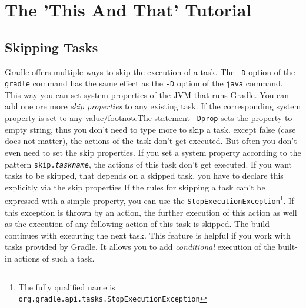 \chapter{The 'This And That' Tutorial} %
\label{cha:the_this_and_that_tutorial}
\section{Skipping Tasks}
Gradle offers multiple ways to skip the execution of a task.
The \texttt{-D} option of the \texttt{gradle} command has the same effect as the \texttt{-D} option of the \texttt{java} command. This way you can set system properties of the JVM that runs Gradle. You can add one ore more \emph{skip properties} to any existing task. If the corresponding system property is set to any value/footnote{The statement \texttt{-Dprop} sets the property to empty string, thus you don't need to type more to skip a task.} except false (case does not matter), the actions of the task don't get executed. But often you don't even need to set the skip properties. If you set a system property according to the pattern \texttt{skip.\emph{taskname}}, the actions of this task don't get executed.
If you want tasks to be skipped, that depends on a skipped task, you have to declare this explicitly via the skip properties
%
If the rules for skipping a task can't be expressed with a simple property, you can use the \texttt{StopExecutionException}\footnote{The fully qualified name is \texttt{org.gradle.api.tasks.StopExecutionException}}. If this exception is thrown by an action, the further execution of this action as well as the execution of any following action of this task is skipped. The build continues with executing the next task.
%
This feature is helpful if you work with tasks provided by Gradle. It allows you to add \emph{conditional} execution of the built-in actions of such a task. 

